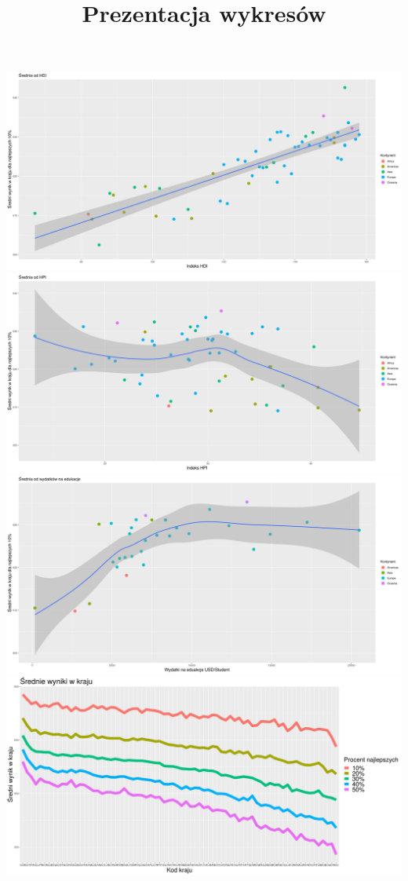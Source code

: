 \documentclass[]{article}
\title{Prezentacja wykresów}
\author{}
\date{}
\begin{document}
\maketitle

\includegraphics[width=1\linewidth]{./Wykres_hdi/best_allto_hdi}
\includegraphics[width=1\linewidth]{./Wykres_HPI/best_allto_HPI}
\includegraphics[width=1\linewidth]{./Wykres_SPEND_ON_EDU/all_EDU}
\includegraphics[width=1\linewidth]{./Wykresiki/best_all}
\end{document}
